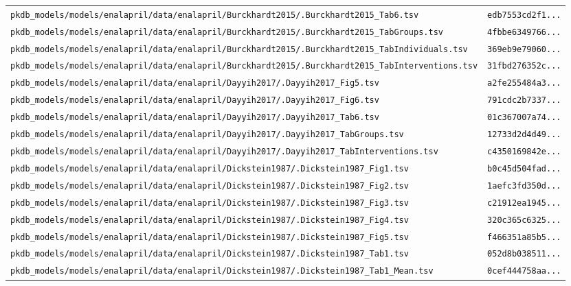 \begin{longtable}{ll}
\texttt{pkdb\_models/models/enalapril/data/enalapril/Burckhardt2015/.Burckhardt2015\_Tab6.tsv} & \texttt{edb7553cd2f1...} \\
\texttt{pkdb\_models/models/enalapril/data/enalapril/Burckhardt2015/.Burckhardt2015\_TabGroups.tsv} & \texttt{4fbbe6349766...} \\
\texttt{pkdb\_models/models/enalapril/data/enalapril/Burckhardt2015/.Burckhardt2015\_TabIndividuals.tsv} & \texttt{369eb9e79060...} \\
\texttt{pkdb\_models/models/enalapril/data/enalapril/Burckhardt2015/.Burckhardt2015\_TabInterventions.tsv} & \texttt{31fbd276352c...} \\
\texttt{pkdb\_models/models/enalapril/data/enalapril/Dayyih2017/.Dayyih2017\_Fig5.tsv} & \texttt{a2fe255484a3...} \\
\texttt{pkdb\_models/models/enalapril/data/enalapril/Dayyih2017/.Dayyih2017\_Fig6.tsv} & \texttt{791cdc2b7337...} \\
\texttt{pkdb\_models/models/enalapril/data/enalapril/Dayyih2017/.Dayyih2017\_Tab6.tsv} & \texttt{01c367007a74...} \\
\texttt{pkdb\_models/models/enalapril/data/enalapril/Dayyih2017/.Dayyih2017\_TabGroups.tsv} & \texttt{12733d2d4d49...} \\
\texttt{pkdb\_models/models/enalapril/data/enalapril/Dayyih2017/.Dayyih2017\_TabInterventions.tsv} & \texttt{c4350169842e...} \\
\texttt{pkdb\_models/models/enalapril/data/enalapril/Dickstein1987/.Dickstein1987\_Fig1.tsv} & \texttt{b0c45d504fad...} \\
\texttt{pkdb\_models/models/enalapril/data/enalapril/Dickstein1987/.Dickstein1987\_Fig2.tsv} & \texttt{1aefc3fd350d...} \\
\texttt{pkdb\_models/models/enalapril/data/enalapril/Dickstein1987/.Dickstein1987\_Fig3.tsv} & \texttt{c21912ea1945...} \\
\texttt{pkdb\_models/models/enalapril/data/enalapril/Dickstein1987/.Dickstein1987\_Fig4.tsv} & \texttt{320c365c6325...} \\
\texttt{pkdb\_models/models/enalapril/data/enalapril/Dickstein1987/.Dickstein1987\_Fig5.tsv} & \texttt{f466351a85b5...} \\
\texttt{pkdb\_models/models/enalapril/data/enalapril/Dickstein1987/.Dickstein1987\_Tab1.tsv} & \texttt{052d8b038511...} \\
\texttt{pkdb\_models/models/enalapril/data/enalapril/Dickstein1987/.Dickstein1987\_Tab1\_Mean.tsv} & \texttt{0cef444758aa...} \\

\end{longtable}
